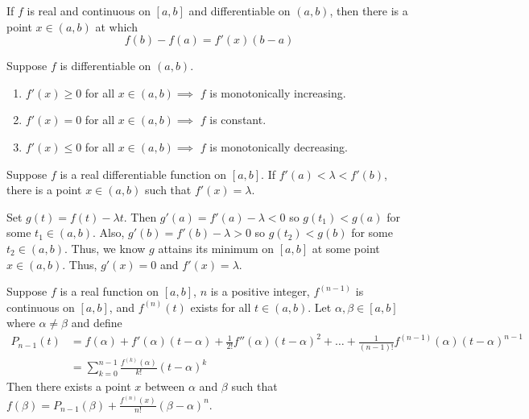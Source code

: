 \documentclass{mathnotes}
\begin{document}
\begin{thm}
  If $f$ is real and continuous on $[a,b]$ and differentiable on $(a,b)$, then
  there is a point $x\in(a,b)$ at which
  $$f(b)-f(a)=f'(x)(b-a)$$
\end{thm}

\begin{cor}
  Suppose $f$ is differentiable on $(a,b)$.
  \begin{enumerate}
    \item $f'(x)\ge0$ for all $x\in(a,b)\implies$ $f$ is monotonically
      increasing.
    \item $f'(x)=0$ for all $x\in(a,b)\implies$ $f$ is constant.
    \item $f'(x)\le0$ for all $x\in(a,b)\implies$ $f$ is monotonically
      decreasing.
  \end{enumerate}
\end{cor}

\begin{prop}
  Suppose $f$ is a real differentiable function on $[a,b]$. If
  $f'(a)<\lambda<f'(b)$, there is a point $x\in(a,b)$ such that
  $f'(x)=\lambda$.
\end{prop}

\begin{pf}
  Set $g(t)=f(t)-\lambda t$. Then $g'(a)=f'(a)-\lambda<0$ so $g(t_1)<g(a)$ for
  some $t_1\in(a,b)$. Also, $g'(b)=f'(b)-\lambda>0$ so $g(t_2)<g(b)$ for some
  $t_2\in(a,b)$. Thus, we know $g$ attains its minimum on $[a,b]$ at some point
  $x\in(a,b)$. Thus, $g'(x)=0$ and $f'(x)=\lambda$.
\end{pf}

\begin{thm}
  Suppose $f$ is a real function on $[a,b]$, $n$ is a positive integer,
  $f^{(n-1)}$ is continuous on $[a,b]$, and $f^{(n)}(t)$ exists for all
  $t\in(a,b)$. Let $\alpha,\beta\in[a,b]$ where $\alpha\neq\beta$ and define
  \begin{align*}
    P_{n-1}(t)&=f(\alpha)+f'(\alpha)(t-\alpha)+\frac{1}{2!}f''(\alpha)
  (t-\alpha)^2+\ldots+\frac{1}{(n-1)!}f^{(n-1)}(\alpha)(t-\alpha)^{n-1}\\
              &=\sum_{k=0}^{n-1}\frac{f^{(k)}(\alpha)}{k!}(t-\alpha)^k
  \end{align*}
  Then there exists a point $x$ between $\alpha$ and $\beta$ such that
  $f(\beta)=P_{n-1}(\beta)+\frac{f^{(n)}(x)}{n!}(\beta-\alpha)^n$.
\end{thm}
\end{document}
